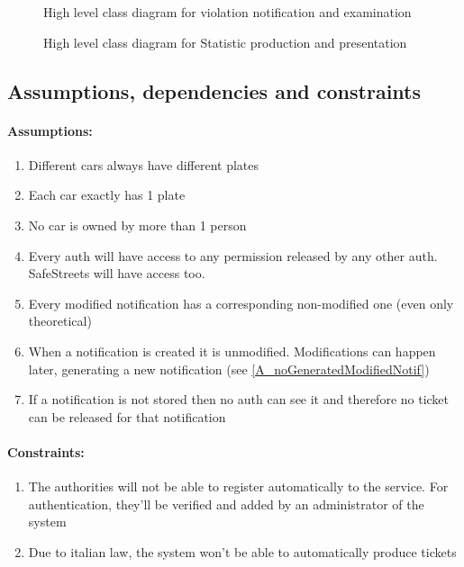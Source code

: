 \documentclass{article}
\newcommand{\enum}[1]{\texttt{#1.\arabic*}}
\begin{document}
		\begin{figure}[H]
			\centering
			\def\svgwidth{\columnwidth}
			
		\caption{High level class diagram for violation notification and examination}
		\end{figure}
				
		\begin{figure}[H]
			\centering
			\def\svgwidth{\columnwidth}
			
		\caption{High level class diagram for Statistic production and presentation}
		\end{figure}
			
	
	\subsection{Assumptions, dependencies and constraints}
	
	\paragraph{Assumptions:}
		\begin{enumerate}[label=\enum{A}]
			\item \label{A_disjPlates} Different cars always have different plates
			\item \label{A_Single plate}Each car exactly has 1 plate
			\item \label{A_singleOwner}No car is owned by more than 1 person
			\item \label{A_accessiblePermissions}Every auth will have access to any permission released by any other auth. SafeStreets will have access too.
			\item \label{A_noGeneratedModifiedNotif}Every modified notification has a corresponding non-modified one (even only theoretical)
			\item \label{A_newNotificationsAreNotModified}When a notification is created it is unmodified. Modifications can happen later, generating a new notification (see \ref{A_noGeneratedModifiedNotif})
			\item \label{A_authsNotClairvoyants}If a notification is not stored then no auth can see it and therefore no ticket can be released for that notification
		\end{enumerate}
	
	\paragraph{Constraints:}
		\begin{enumerate}[label=\enum{C}]
			\item The authorities will not be able to register automatically to the service. For authentication, they'll be verified and added by an administrator of the system
			\item \label{C_noAutoTickets}Due to italian law, the system won't be able to automatically produce tickets
		\end{enumerate}
	
\end{document}

